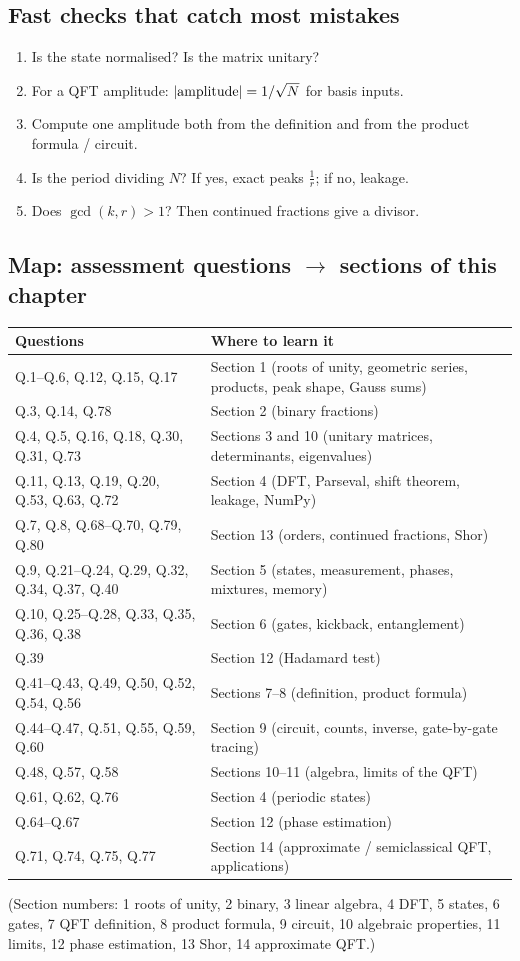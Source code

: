 \documentclass[11pt,a4paper,openany]{book}
\begin{document}
\subsection{Fast checks that catch most mistakes}
\begin{enumerate}[itemsep=2pt]
\item Is the state normalised? Is the matrix unitary?
\item For a QFT amplitude: $|{\rm amplitude}| = 1/\sqrt N$ for basis inputs.
\item Compute one amplitude both from the definition and from the product formula / circuit.
\item Is the period dividing $N$? If yes, exact peaks $\frac1r$; if no, leakage.
\item Does $\gcd(k, r) > 1$? Then continued fractions give a divisor.
\end{enumerate}

\subsection{Map: assessment questions $\to$ sections of this chapter}
\begin{tabularx}{\linewidth}{@{}lX@{}}
\toprule
\textbf{Questions} & \textbf{Where to learn it}\\ \midrule
Q.1--Q.6, Q.12, Q.15, Q.17 & Section 1 (roots of unity, geometric series, products, peak shape, Gauss sums)\\
Q.3, Q.14, Q.78 & Section 2 (binary fractions)\\
Q.4, Q.5, Q.16, Q.18, Q.30, Q.31, Q.73 & Sections 3 and 10 (unitary matrices, determinants, eigenvalues)\\
Q.11, Q.13, Q.19, Q.20, Q.53, Q.63, Q.72 & Section 4 (DFT, Parseval, shift theorem, leakage, NumPy)\\
Q.7, Q.8, Q.68--Q.70, Q.79, Q.80 & Section 13 (orders, continued fractions, Shor)\\
Q.9, Q.21--Q.24, Q.29, Q.32, Q.34, Q.37, Q.40 & Section 5 (states, measurement, phases, mixtures, memory)\\
Q.10, Q.25--Q.28, Q.33, Q.35, Q.36, Q.38 & Section 6 (gates, kickback, entanglement)\\
Q.39 & Section 12 (Hadamard test)\\
Q.41--Q.43, Q.49, Q.50, Q.52, Q.54, Q.56 & Sections 7--8 (definition, product formula)\\
Q.44--Q.47, Q.51, Q.55, Q.59, Q.60 & Section 9 (circuit, counts, inverse, gate-by-gate tracing)\\
Q.48, Q.57, Q.58 & Sections 10--11 (algebra, limits of the QFT)\\
Q.61, Q.62, Q.76 & Section 4 (periodic states)\\
Q.64--Q.67 & Section 12 (phase estimation)\\
Q.71, Q.74, Q.75, Q.77 & Section 14 (approximate / semiclassical QFT, applications)\\
\bottomrule
\end{tabularx}
{\small (Section numbers: 1 roots of unity, 2 binary, 3 linear algebra, 4 DFT, 5 states, 6 gates, 7 QFT definition,
8 product formula, 9 circuit, 10 algebraic properties, 11 limits, 12 phase estimation, 13 Shor, 14 approximate QFT.)}
\end{document}

